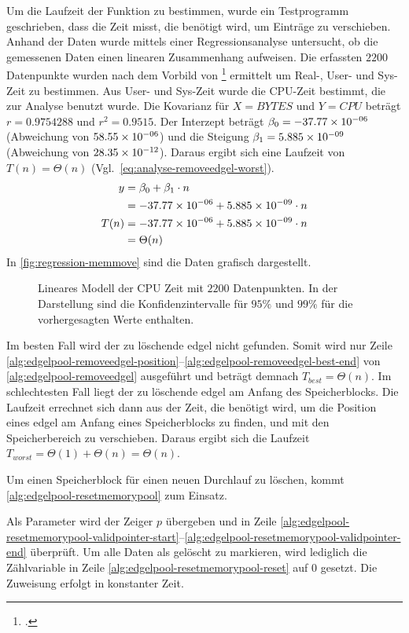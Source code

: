 Um die Laufzeit der Funktion  zu bestimmen, wurde ein Testprogramm geschrieben, dass die Zeit misst,
 die benötigt wird, um Einträge zu verschieben. Anhand der Daten wurde mittels einer Regressionsanalyse untersucht, ob
 die gemessenen Daten einen linearen Zusammenhang aufweisen. Die erfassten $2200$ Datenpunkte wurden nach dem Vorbild
 von \footcite{time-1} ermittelt um Real-, User- und Sys-Zeit zu bestimmen. Aus User- und Sys-Zeit wurde
 die CPU-Zeit bestimmt, die zur Analyse benutzt wurde. Die Kovarianz für $X = \mathit{BYTES}$ und $Y = \mathit{CPU}$
 beträgt $r = 0.9754288$ und $r^2 = 0.9515$. Der Interzept beträgt $\beta_0 = -37.77\times 10^{-06}$ (Abweichung von
 $58.55\times 10^{-06}$) und die Steigung $\beta_1 = 5.885\times 10^{-09}$ (Abweichung von $28.35\times 10^{-12}$). Daraus ergibt sich eine
 Laufzeit von $T(n) =\Theta(n)$ (Vgl.~\autoref{eq:analyse-removeedgel-worst}).
\begin{equation}
	\label{eq:analyse-removeedgel-worst}
	\begin{split}
		y& = \beta_0 + \beta_1 \cdot n\\
		 & = -37.77\times 10^{-06} + 5.885\times 10^{-09} \cdot n\\
		T(n)& = -37.77\times 10^{-06} + 5.885\times 10^{-09} \cdot n\\
		 & = \Theta(n)
	\end{split}
\end{equation}
In \autoref{fig:regression-memmove} sind die Daten grafisch dargestellt.
\begin{figure}[!ht]
	\centering
	
	\caption{Lineares Modell der CPU Zeit mit $2200$ Datenpunkten. In der Darstellung sind die Konfidenzintervalle für
	 $95\%$ und $99\%$ für die vorhergesagten Werte enthalten.}
	\label{fig:regression-memmove}
\end{figure}
Im besten Fall wird der zu löschende \gls{edgel} nicht gefunden. Somit wird nur Zeile
 \ref{alg:edgelpool-removeedgel-position}--\ref{alg:edgelpool-removeedgel-best-end} von
 \autoref{alg:edgelpool-removeedgel} ausgeführt und beträgt demnach $T_{best} = \Theta(n)$. Im schlechtesten Fall
 liegt der zu löschende \gls{edgel} am Anfang des Speicherblocks. Die Laufzeit errechnet sich dann aus der Zeit, die
 benötigt wird, um die Position eines \gls{edgel} am Anfang eines Speicherblocks zu finden, und mit 
 den Speicherbereich zu verschieben. Daraus ergibt sich die Laufzeit $T_{worst} = \Theta(1) + \Theta(n) = \Theta(n)$.

Um einen Speicherblock für einen neuen Durchlauf zu löschen, kommt \autoref{alg:edgelpool-resetmemorypool} zum Einsatz.

 Als Parameter wird der Zeiger $p$ übergeben und in Zeile
 \ref{alg:edgelpool-resetmemorypool-validpointer-start}--\ref{alg:edgelpool-resetmemorypool-validpointer-end}
 überprüft. Um alle Daten als gelöscht zu markieren, wird lediglich die Zählvariable in Zeile
 \ref{alg:edgelpool-resetmemorypool-reset} auf $0$ gesetzt. Die Zuweisung erfolgt in konstanter Zeit.

